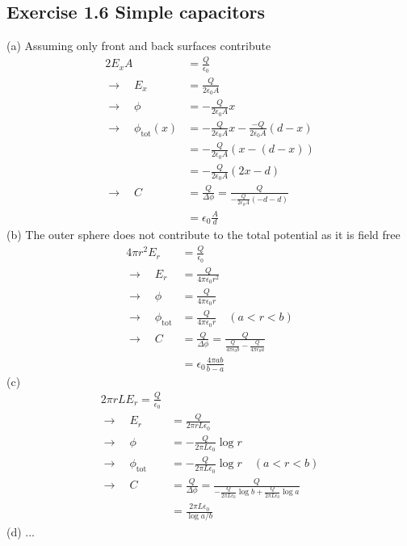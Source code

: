 \documentclass[../main.tex]{subfiles}
\begin{document}
\subsection{Exercise 1.6 Simple capacitors}
(a) Assuming only front and back surfaces contribute
\begin{align}
2E_xA&=\frac{Q}{\epsilon_0}\\
\rightarrow\quad E_x&=\frac{Q}{2\epsilon_0A}\\
\rightarrow\quad \phi&=-\frac{Q}{2\epsilon_0A}x\\
\rightarrow\quad \phi_\text{tot}(x)&=-\frac{Q}{2\epsilon_0A}x-\frac{-Q}{2\epsilon_0A}(d-x)\\
&=-\frac{Q}{2\epsilon_0A}(x-(d-x))\\
&=-\frac{Q}{2\epsilon_0A}(2x-d)\\
\rightarrow\quad C&=\frac{Q}{\Delta\phi}=\frac{Q}{-\frac{Q}{2\epsilon_0A}(-d-d)}\\
&=\epsilon_0\frac{A}{d}
\end{align}
(b) The outer sphere does not contribute to the total potential as it is field free
\begin{align}
4\pi r^2 E_r&=\frac{Q}{\epsilon_0}\\
\rightarrow\quad E_r&=\frac{Q}{4\pi\epsilon_0 r^2}\\
\rightarrow\quad \phi&=\frac{Q}{4\pi\epsilon_0 r}\\
\rightarrow\quad \phi_\text{tot}&=\frac{Q}{4\pi\epsilon_0 r}\quad(a<r<b)\\
\rightarrow\quad C&=\frac{Q}{\Delta\phi}=\frac{Q}{\frac{Q}{4\pi\epsilon_0 b}-\frac{Q}{4\pi\epsilon_0 a}}\\
&=\epsilon_0\frac{4\pi ab}{b-a}
\end{align}
(c) 
\begin{align}
2\pi r L E_r=\frac{Q}{\epsilon_0}\\
\rightarrow\quad E_r&=\frac{Q}{2\pi r L\epsilon_0}\\
\rightarrow\quad \phi&=-\frac{Q}{2\pi L\epsilon_0}\log r\\
\rightarrow\quad \phi_\text{tot}&=-\frac{Q}{2\pi L\epsilon_0}\log r\quad(a<r<b)\\
\rightarrow\quad C&=\frac{Q}{\Delta\phi}=\frac{Q}{-\frac{Q}{2\pi L\epsilon_0}\log b+\frac{Q}{2\pi L\epsilon_0}\log a}\\
&=\frac{2\pi L\epsilon_0}{\log a/b}
\end{align}
(d) ...
\end{document}
